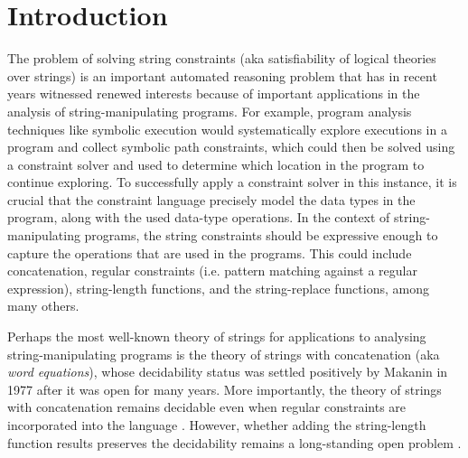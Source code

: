 
\section{Introduction}

The problem of %
solving string constraints (aka satisfiability of logical theories over
strings)
is an important automated reasoning problem that has in recent years witnessed
renewed interests %
\cite{Berkeley-JavaScript,TCJ16,LB16,YABI14,S3,Abdulla14,Abdulla17,DV13,symbolic-transducer,BEK} 
because of important applications in the analysis of 
string-manipulating programs. For example,
program analysis techniques like symbolic execution \cite{king76,DART,EXE} 
would
systematically explore executions in a program and collect symbolic path 
constraints, which could then be solved using a constraint solver and
used to determine which location in the program to continue exploring.
To successfully apply a constraint solver in this instance, it is
crucial that the constraint language precisely model the data types in the
program, along with the used data-type operations. In the context of
string-manipulating programs, the string constraints should be expressive enough
to capture the operations that are used in the programs. This could include 
concatenation, regular constraints (i.e. pattern matching against a regular
expression), string-length functions, and the string-replace functions, among 
many others.

Perhaps the most well-known theory of strings for applications to analysing
string-manipulating programs is the theory of strings with concatenation 
(aka \emph{word equations}),
whose decidability status was settled positively by Makanin \cite{Makanin}
in 1977 after it was open for many years. More importantly, 
the theory of strings with concatenation remains 
decidable even when regular constraints are incorporated into the 
language \cite{Schulz}. However, whether adding the string-length function
results preserves the decidability remains a long-standing open problem
\cite{Vijay-length,buchi}.

